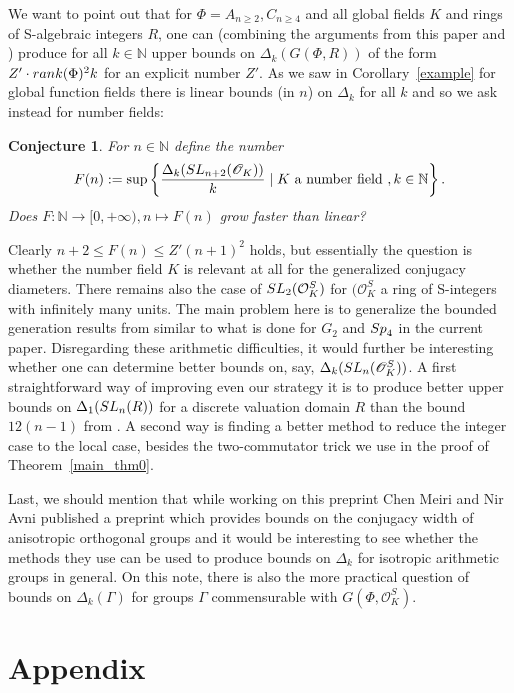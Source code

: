 \documentclass[12pt]{amsart}
\newcommand{\C}[1]{{\mathcal #1}}
\newtheorem{conjecture}[theorem]{Conjecture}
\theoremstyle{definition}\newtheorem{definition}[theorem]{Definition}
\theoremstyle{remark}\newtheorem{remark}[theorem]{Remark}
\theoremstyle{definition}\newtheorem{case}{Case}
\begin{document}
We want to point out that for $\Phi=A_{n\geq 2},C_{n\geq 4}$ and all global fields $K$ and rings of S-algebraic integers $R$, one can (combining the arguments from this paper and \cite{KLM,explicit_strong_bound_sp_2n}) produce for all $k\in\mathbb{N}$ upper bounds on $\Delta_k(G(\Phi,R))$ of the form $Z'\cdot{\rm rank}(\Phi)^2k$ for an explicit number $Z'$. As we saw in Corollary~\ref{example} for global function fields there is linear bounds (in $n$) on $\Delta_k$ for all $k$ and so we ask instead for number fields: 

\begin{conjecture}
For $n\in\mathbb{N}$ define the number
\[
F(n):=\sup\left\{\frac{\Delta_k({\rm SL}_{n+2}(\mathscr{O}_K))}{k}\mid K\text{ a number field },k\in\mathbb{N}\right\}.
\]
Does $F:\mathbb{N}\to[0,+\infty),n\mapsto F(n)$ grow faster than linear?
\end{conjecture}
Clearly $n+2\leq F(n)\leq Z'(n+1)^2$ holds, but essentially the question is whether the number field $K$ is relevant at all for the generalized conjugacy diameters. There remains also the case of ${\rm SL}_2(\C O_K^{S})$ for $(\C O_K^S$ a ring of S-integers with infinitely many units. The main problem here is to generalize the bounded generation results from \cite{gvozdevsky2023width} similar to what is done for $G_2$ and ${\rm Sp}_4$ in the current paper. Disregarding these arithmetic difficulties, it would further be interesting whether one can determine better bounds on, say, $\Delta_k({\rm SL}_n(\mathscr{O}_K^S))$. A first straightforward way of improving even our strategy it is to produce better upper bounds on $\Delta_1({\rm SL}_n(R))$ for a discrete valuation domain $R$ than the bound $12(n-1)$ from \cite{KLM}. A second way is finding a better method to reduce the integer case to the local case, besides the two-commutator trick we use in the proof of Theorem~\ref{main_thm0}.

Last, we should mention that while working on this preprint Chen Meiri and Nir Avni published a preprint which provides bounds on the conjugacy width of anisotropic orthogonal groups \cite{avni2023conjugacy} and it would be interesting to see whether the methods they use can be used to produce bounds on $\Delta_k$ for isotropic arithmetic groups in general. On this note, there is also the more practical question of bounds on $\Delta_k(\Gamma)$ for groups $\Gamma$ commensurable with $G(\Phi,\mathscr{O}_K^S).$ 

\section*{Appendix}\label{appendix}
\end{document}
